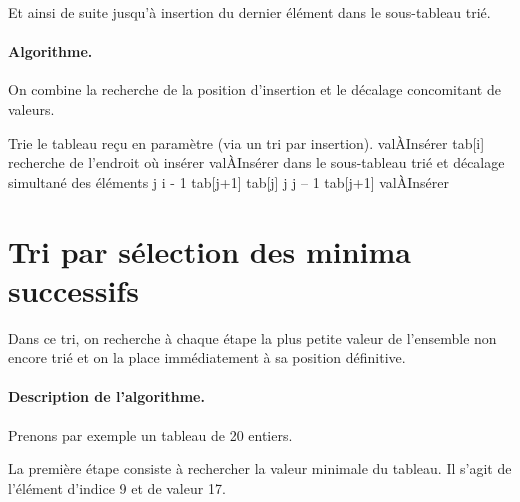 	\medskip

	Et ainsi de suite jusqu’à insertion du dernier élément dans le
	sous-tableau trié. 

	\paragraph{Algorithme.}

	On combine la recherche de la position d’insertion et le décalage
	concomitant de valeurs.

	\begin{LDA}
		\LComment Trie le tableau reçu en paramètre (via un tri par insertion).
				\Let valÀInsérer \Gets tab[i]
				\LComment recherche de l’endroit où insérer valÀInsérer dans le 
				\LComment sous-tableau trié et décalage simultané des éléments
				\Let j \Gets i - 1
					\Let tab[j+1] \Gets tab[j]
					\Let j \Gets j – 1
				\EndWhile
				\Let tab[j+1] \Gets valÀInsérer
			\EndFor
		\EndAlgo
	\end{LDA}

\clearpage
\section{Tri par sélection des minima successifs}
	
	Dans ce tri, on recherche à chaque étape la plus petite valeur de
	l’ensemble non encore trié et on la place immédiatement 
	à sa position définitive.

	\paragraph{Description de l’algorithme.}

	Prenons par exemple un tableau de 20 entiers. 
	
	La première étape consiste
	à rechercher la valeur minimale du tableau. Il s’agit de l’élément
	d’indice 9 et de valeur 17.
	
